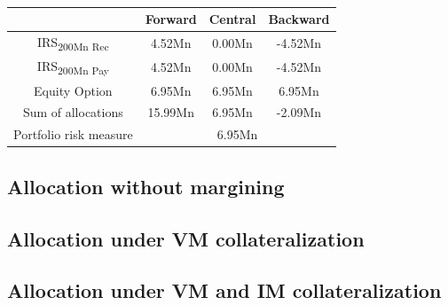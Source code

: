 \documentclass[../Thesis_AHoecherl.tex]{subfiles}
\begin{document}
    \begin{table}[htbp]
        \label{tab:IM perfect hedge}
        \centering
            \begin{tabular}{c|c|c|c}
                & Forward & Central & Backward \\
                \toprule
                IRS\textsubscript{200Mn Rec} & 4.52Mn & 0.00Mn & -4.52Mn \\
                \midrule
                IRS\textsubscript{200Mn Pay} & 4.52Mn & 0.00Mn & -4.52Mn \\
                \midrule
                Equity Option & 6.95Mn & 6.95Mn & 6.95Mn \\
                \bottomrule
                Sum of allocations & 15.99Mn & 6.95Mn & -2.09Mn \\
                \midrule
                Portfolio risk measure & \multicolumn{3}{c}{6.95Mn}  \\
            \end{tabular}%
        \caption{}
    \end{table}

    \subsection{Allocation without margining}
    \subsection{Allocation under VM collateralization}
    \subsection{Allocation under VM and IM collateralization}
\end{document}
